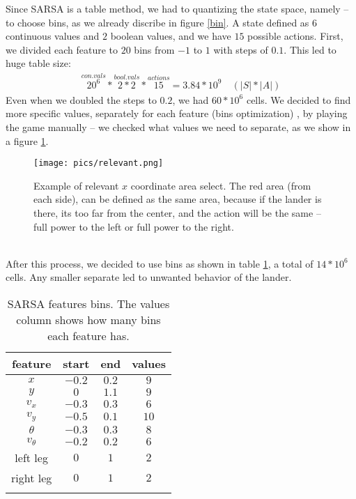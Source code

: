 \documentclass{article}
\begin{document}
	Since SARSA is a table method, we had to quantizing the state space, namely -- to choose bins, as we already discribe in figure \ref{bin}. A state defined as $ 6 $ continuous values and $ 2 $ boolean values, and we have $ 15 $ possible actions. First, we divided each feature to $ 20 $ bins from $ -1 $ to $ 1 $ with steps of $ 0.1 $. This led to huge table size:
	\begin{gather*}
	\overset{con. vals}{20^6} * \overset{bool. vals}{2 * 2} * \overset{actions}{15} = 3.84*10^9 \quad (|S| * |A|)
	\end{gather*}
	Even when we doubled the steps to $ 0.2 $, we had $ 60*10^6 $ cells. We decided to find more specific values, separately for each feature (bins optimization) \cite{gadgil2020solving},  by playing the game manually -- we checked what values we need to separate, as we show in a figure \ref{relevant}.
	\begin{figure}[h!]
		\begin{center}
			\texttt{[image: pics/relevant.png]}
		\end{center}
		\caption{Example of relevant $ x $ coordinate area select. The red area (from each side), can be defined as the same area, because if the lander is there, its too far from the center, and the action will be the same -- full power to the left or full power to the right.}
		\label{relevant}
	\end{figure}
\\
	After this process, we decided to use bins as shown in table \ref{sarsa-table}, a total of $ 14*10^6 $ cells. Any smaller separate led to unwanted behavior of the lander.
	\begin{table}[h!]
		\centering
		\begin{tabular}{@{}cccc@{}}
			\toprule
			\textbf{feature} & \textbf{start} & \textbf{end} & \textbf{values} \\ \midrule
			$x$              & $-0.2$         & $0.2$        & $9$             \\ \midrule
			$y$              & $0$            & $1.1$        & $9$             \\ \midrule
			$v_x$            & $-0.3$         & $0.3$        & $6$             \\ \midrule
			$v_y$            & $-0.5$         & $0.1$        & $10$            \\ \midrule
			$\theta$         & $-0.3$         & $0.3$        & $8$             \\ \midrule
			$v_{\theta}$     & $-0.2$         & $0.2$        & $6$             \\ \midrule
			left leg         & $0$            & $1$          & $2$             \\ \midrule
			right leg        & $0$            & $1$          & $2$             \\ \bottomrule \\
		\end{tabular}
		\captionsetup{width=\textwidth/2}
		\caption{SARSA features bins. The values column shows how many bins each feature has.}
		\label{sarsa-table}
	\end{table}
\end{document}
